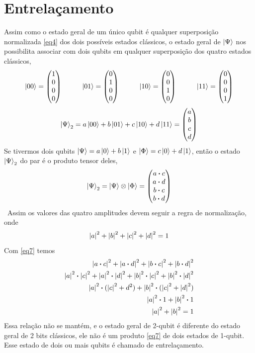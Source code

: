 \documentclass[a4paper, 12pt, oneside]{book}
\begin{document}
\section{Entrelaçamento}
Assim como o estado geral de um único qubit é qualquer superposição normalizada \eqref{eq4} dos dois possíveis estados clássicos, o estado geral de $\ket{\Psi}$ nos possibilita associar com dois qubits em qualquer superposição dos quatro estados clássicos,
\begin{equation}\label{eq5}
  \ket{00} = \mqty(1\\0\\0\\0) \hspace{1cm} 
  \ket{01} = \mqty(0\\1\\0\\0) \hspace{1cm} 
  \ket{10} = \mqty(0\\0\\1\\0) \hspace{1cm} 
  \ket{11} = \mqty(0\\0\\0\\1)
\end{equation}
\begin{equation}\label{eq6}
\ket{\Psi}_2 = a\ket{00} + b\ket{01} + c\ket{10} + d\ket{11} = \mqty(a\\b\\c\\d)
\end{equation}
Se tivermos dois qubits $\ket{\Psi} = a\ket{0} + b\ket{1}$ e $\ket{\Phi} = c\ket{0} + d\ket{1}$, então o estado $\ket{\Psi}_2$ do par é o produto tensor deles,
\begin{equation}\label{eq7}
\ket{\Psi}_2 = \ket{\Psi}\otimes\ket{\Phi} = \mqty(a \vdot c\\a \vdot d\\b \vdot c\\b \vdot d)
\end{equation}\
Assim os valores das quatro amplitudes devem seguir a regra de normalização, onde
\begin{equation}
\abs{a}^2 + \abs{b}^2 + \abs{c}^2 + \abs{d}^2 = 1
\end{equation}
Com \eqref{eq7} temos
\begin{align}
\abs{a \vdot c}^2 + \abs{a \vdot d}^2 + \abs{b \vdot c}^2 + \abs{b \vdot d}^2 \\
\abs{a}^2 \vdot \abs{c}^2 + \abs{a}^2 \vdot \abs{d}^2 + \abs{b}^2 \vdot \abs{c}^2 + \abs{b}^2 \vdot \abs{d}^2 \\
\abs{a}^2 \vdot (\abs{c}^2 + {d}^2) + \abs{b}^2 \vdot (\abs{c}^2 + \abs{d}^2) \\
\abs{a}^2 \vdot 1 + \abs{b}^2 \vdot 1 \\
\abs{a}^2 + \abs{b}^2 = 1
\end{align}
Essa relação não se mantém, e o estado geral de 2-qubit é diferente do estado geral de 2 bits clássicos, ele não é um produto \ref{eq7} de dois estados de 1-qubit. Esse estado de dois ou mais qubits é chamado de entrelaçamento.
\end{document}
